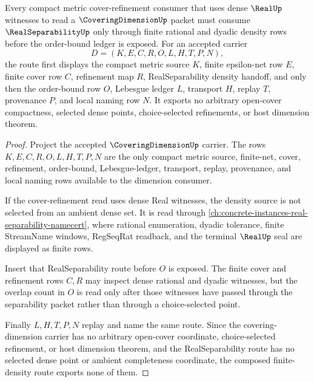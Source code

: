 \begin{theorem}
\label{thm:real-separability-coveringdimension-finite-density-route}
Every compact metric cover-refinement consumer that uses dense $\RealUp$ witnesses to read a $\CoveringDimensionUp$ packet must consume $\RealSeparabilityUp$ only through finite rational and dyadic density rows before the order-bound ledger is exposed. For an accepted carrier
$$
D=(K,E,C,R,O,L,H,T,P,N),
$$
the route first displays the compact metric source $K$, finite epsilon-net row $E$, finite cover row $C$, refinement map $R$, RealSeparability density handoff, and only then the order-bound row $O$, Lebesgue ledger $L$, transport $H$, replay $T$, provenance $P$, and local naming row $N$. It exports no arbitrary open-cover compactness, selected dense points, choice-selected refinements, or host dimension theorem.
\end{theorem}
\begin{proof}
Project the accepted $\CoveringDimensionUp$ carrier. The rows $K,E,C,R,O,L,H,T,P,N$ are the only compact metric source, finite-net, cover, refinement, order-bound, Lebesgue-ledger, transport, replay, provenance, and local naming rows available to the dimension consumer.

If the cover-refinement read uses dense Real witnesses, the density source is not selected from an ambient dense set. It is read through \autoref{ch:concrete-instances-real-separability-namecert}, where rational enumeration, dyadic tolerance, finite StreamName windows, RegSeqRat readback, and the terminal $\RealUp$ seal are displayed as finite rows.

Insert that RealSeparability route before $O$ is exposed. The finite cover and refinement rows $C,R$ may inspect dense rational and dyadic witnesses, but the overlap count in $O$ is read only after those witnesses have passed through the separability packet rather than through a choice-selected point.

Finally $L,H,T,P,N$ replay and name the same route. Since the covering-dimension carrier has no arbitrary open-cover coordinate, choice-selected refinement, or host dimension theorem, and the RealSeparability route has no selected dense point or ambient completeness coordinate, the composed finite-density route exports none of them.
\end{proof}

